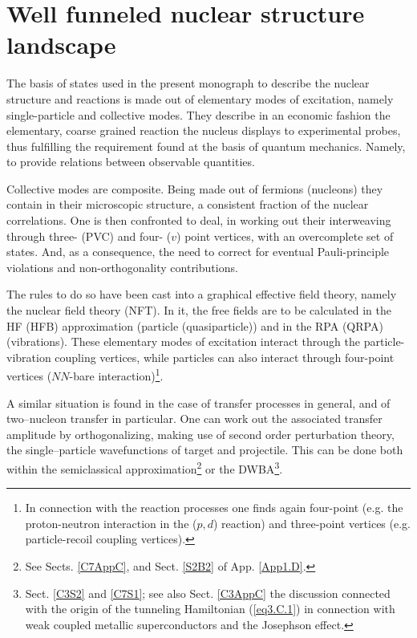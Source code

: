 \section{Well funneled nuclear structure landscape}\label{C1S4}
The basis of states used in the present monograph to describe the nuclear structure and reactions is made out of elementary modes of excitation, namely single-particle and collective modes. They describe in an economic fashion the elementary, coarse grained reaction the nucleus displays to experimental probes, thus fulfilling the requirement found at the basis of quantum mechanics. Namely, to provide relations between observable quantities.

Collective modes are composite. Being made out of fermions (nucleons) they contain in their microscopic structure, a consistent fraction of the nuclear correlations. One is  then confronted to deal, in working out their interweaving through three- (PVC) and four- ($v$) point vertices, with an overcomplete set of states. And, as a consequence, the need to correct for eventual Pauli-principle violations and non-orthogonality contributions.

 The rules to do so have been cast into a graphical effective field theory, namely the nuclear field theory (NFT). In it, the free fields are to be calculated in the HF (HFB) approximation (particle (quasiparticle)) and in the RPA (QRPA) (vibrations). These elementary modes of excitation interact through the particle-vibration coupling vertices, while particles can also interact through four-point vertices ($NN$-bare interaction)\footnote{In connection with the reaction processes one finds again four-point  (e.g. the proton-neutron interaction in the ($p,d$) reaction) and three-point vertices (e.g. particle-recoil coupling vertices).}.

A similar situation is found in the case of transfer processes in general, and of two--nucleon transfer in particular. One can work out the associated transfer amplitude by orthogonalizing, making use of second order perturbation theory, the single--particle wavefunctions of target and projectile. This can be done both within the semiclassical approximation\footnote{See Sects. \ref{C7AppC}, and  Sect. \ref{S2B2} of App. \ref{App1.D}.}  or the  DWBA\footnote{Sect. \ref{C3S2} and \ref{C7S1}; see also Sect. \ref{C3AppC} the discussion connected with the origin of the tunneling Hamiltonian (\ref{eq3.C.1}) in connection with weak coupled metallic superconductors and  the Josephson effect.}. 

